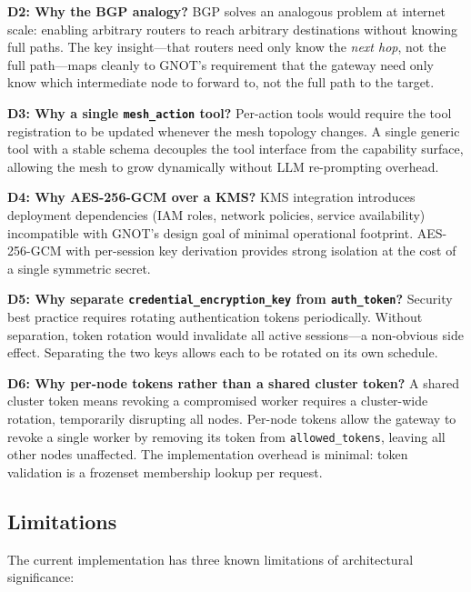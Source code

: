 \documentclass[10pt,twocolumn]{article}
\begin{document}
\textbf{D2: Why the BGP analogy?}
BGP solves an analogous problem at internet scale: enabling arbitrary
routers to reach arbitrary destinations without knowing full paths. The
key insight---that routers need only know the \emph{next hop}, not the
full path---maps cleanly to GNOT's requirement that the gateway need
only know which intermediate node to forward to, not the full path to
the target.

\textbf{D3: Why a single \texttt{mesh\_action} tool?}
Per-action tools would require the tool registration to be updated
whenever the mesh topology changes. A single generic tool with a stable
schema decouples the tool interface from the capability surface,
allowing the mesh to grow dynamically without LLM re-prompting overhead.

\textbf{D4: Why AES-256-GCM over a KMS?}
KMS integration introduces deployment dependencies (IAM roles, network
policies, service availability) incompatible with GNOT's design goal of
minimal operational footprint. AES-256-GCM with per-session key
derivation provides strong isolation at the cost of a single symmetric
secret.

\textbf{D5: Why separate \texttt{credential\_encryption\_key} from
\texttt{auth\_token}?}
Security best practice requires rotating authentication tokens
periodically. Without separation, token rotation would invalidate all
active sessions---a non-obvious side effect. Separating the two keys
allows each to be rotated on its own schedule.

\textbf{D6: Why per-node tokens rather than a shared cluster token?}
A shared cluster token means revoking a compromised worker requires a
cluster-wide rotation, temporarily disrupting all nodes. Per-node tokens
allow the gateway to revoke a single worker by removing its token from
\texttt{allowed\_tokens}, leaving all other nodes unaffected. The
implementation overhead is minimal: token validation is a frozenset
membership lookup per request.

\subsection{Limitations}

The current implementation has three known limitations of architectural
significance:
\end{document}

